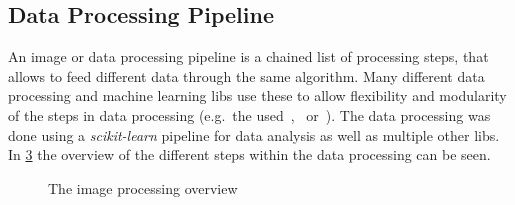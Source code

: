 \documentclass[12pt,a4paper, english,twoside]{article}
\begin{document}
    \subsection{Data Processing Pipeline}
      An image or data processing pipeline is a chained list of processing steps, that allows to feed different data through the same algorithm. 
      Many different data processing and machine learning \glspl{lib} use these to allow flexibility and modularity of the steps in data processing (e.g.\ the used~\cite{scikit-learn},~\cite{keras} or~\cite{gluon}). 
      The data processing was done using a \textit{scikit-learn} pipeline for data analysis as well as multiple other \glspl{lib}. 
      In \cref{fig:pipeline} the overview of the different steps within the data processing can be seen.
      \begin{figure}[!htbp]
         \begin{subfigure}[b]{0.40\textwidth}
           
           \label{fig:pipelineTraining}
         \end{subfigure}
         \begin{subfigure}[b]{0.40\textwidth}
           
           \label{fig:pipelineTrained}
         \end{subfigure}
         \caption{The image processing overview\label{fig:pipeline}}
       \end{figure}
  \newpage
\end{document}
